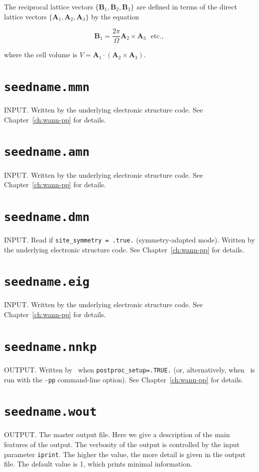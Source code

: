 The reciprocal lattice vectors
$\{\mathbf{B}_{1},\mathbf{B}_{2},\mathbf{B}_{3}\}$ are defined in
terms
of the direct lattice vectors
$\{\mathbf{A}_{1},\mathbf{A}_{2},\mathbf{A}_{3}\}$ by the equation

\begin{equation}
\mathbf{B}_{1} = \frac{2\pi}{\Omega}\mathbf{A}_{2}\times\mathbf{A}_{3}
\ \ \ \mathrm{etc.},
\end{equation}

where the cell volume is
$V=\mathbf{A}_{1}\cdot(\mathbf{A}_{2}\times\mathbf{A}_{3})$.

\section{{\tt seedname.mmn}}
INPUT. Written by the underlying electronic structure code. See
Chapter~\ref{ch:wann-pp} for details.

\section{{\tt seedname.amn}}
INPUT. Written by the underlying electronic structure code. See
Chapter~\ref{ch:wann-pp} for details. 

\section{{\tt seedname.dmn}}
INPUT. Read if \verb#site_symmetry = .true.# (symmetry-adapted mode).
Written by the underlying electronic structure code. See Chapter~\ref{ch:wann-pp} for details.

\section{{\tt seedname.eig}}
INPUT. Written by the underlying electronic structure code. See
Chapter~\ref{ch:wann-pp} for details.

\section{{\tt seedname.nnkp}} \label{sec:old-nnkp}
OUTPUT. Written by \wannier\ when {\tt postproc\_setup=.TRUE.} (or,
alternatively, when \wannier\ is run with the {\tt -pp} command-line
option). See Chapter~\ref{ch:wann-pp} for details.

\section{{\tt seedname.wout}}
OUTPUT. The master output file. Here we give a description of the main
features of the output. The verbosity of the output is controlled by
the input parameter {\tt iprint}. The higher the value, the more
detail is given in the output file. The default value is 1, which prints
minimal information.

